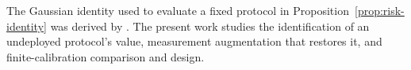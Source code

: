The Gaussian identity used to evaluate a fixed protocol in
Proposition~\ref{prop:risk-identity} was derived by
\citet{zhang2026label}. The present work studies the identification of an
undeployed protocol's value, measurement augmentation that restores it, and
finite-calibration comparison and design.
